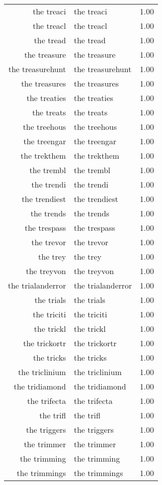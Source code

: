 \begin{table}[ht]
\begin{tabular}{rlr}
  the treaci & the treaci & 1.00 \\ 
  the treacl & the treacl & 1.00 \\ 
  the tread & the tread & 1.00 \\ 
  the treasure & the treasure & 1.00 \\ 
  the treasurehunt & the treasurehunt & 1.00 \\ 
  the treasures & the treasures & 1.00 \\ 
  the treaties & the treaties & 1.00 \\ 
  the treats & the treats & 1.00 \\ 
  the treehous & the treehous & 1.00 \\ 
  the treengar & the treengar & 1.00 \\ 
  the trekthem & the trekthem & 1.00 \\ 
  the trembl & the trembl & 1.00 \\ 
  the trendi & the trendi & 1.00 \\ 
  the trendiest & the trendiest & 1.00 \\ 
  the trends & the trends & 1.00 \\ 
  the trespass & the trespass & 1.00 \\ 
  the trevor & the trevor & 1.00 \\ 
  the trey & the trey & 1.00 \\ 
  the treyvon & the treyvon & 1.00 \\ 
  the trialanderror & the trialanderror & 1.00 \\ 
  the trials & the trials & 1.00 \\ 
  the triciti & the triciti & 1.00 \\ 
  the trickl & the trickl & 1.00 \\ 
  the trickortr & the trickortr & 1.00 \\ 
  the tricks & the tricks & 1.00 \\ 
  the triclinium & the triclinium & 1.00 \\ 
  the tridiamond & the tridiamond & 1.00 \\ 
  the trifecta & the trifecta & 1.00 \\ 
  the trifl & the trifl & 1.00 \\ 
  the triggers & the triggers & 1.00 \\ 
  the trimmer & the trimmer & 1.00 \\ 
  the trimming & the trimming & 1.00 \\ 
  the trimmings & the trimmings & 1.00 \\ 

\end{tabular}
\end{table}
